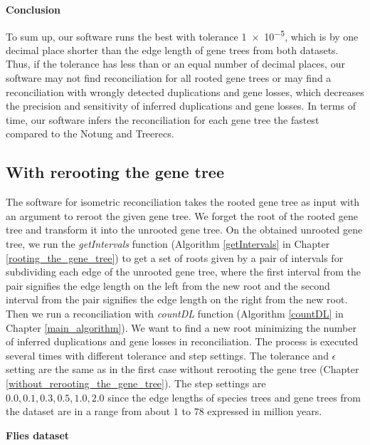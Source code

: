 \noindent \textbf{Conclusion}

To sum up, our software runs the best with tolerance \num {1e-5}, which is by one decimal place shorter than the edge length of gene trees from both datasets. Thus, if the tolerance has less than or an equal number of decimal places, our software may not find reconciliation for all rooted gene trees or may find a reconciliation with wrongly detected duplications and gene losses, which decreases the precision and sensitivity of inferred duplications and gene losses. In terms of time, our software infers the reconciliation for each gene tree the fastest compared to the Notung and Treerecs.


\subsection{With rerooting the gene tree}

The software for isometric reconciliation takes the rooted gene tree as input with an argument to reroot the given gene tree. We forget the root of the rooted gene tree and transform it into the unrooted gene tree. On the obtained unrooted gene tree, we run the \emph{getIntervals} function (Algorithm \ref{getIntervals} in Chapter \ref{rooting_the_gene_tree}) to get a set of roots given by a pair of intervals for subdividing each edge of the unrooted gene tree, where the first interval from the pair signifies the edge length on the left from the new root and the second interval from the pair signifies the edge length on the right from the new root. Then we run a reconciliation with \emph{countDL} function (Algorithm \ref{countDL} in Chapter \ref{main_algorithm}). We want to find a new root minimizing the number of inferred duplications and gene losses in reconciliation. The process is executed several times with different tolerance and step settings. The tolerance and $\epsilon$ setting are the same as in the first case without rerooting the gene tree (Chapter \ref{without_rerooting_the_gene_tree}). The step settings are $0.0, 0.1, 0.3, 0.5, 1.0, 2.0$ since the edge lengths of species trees and gene trees from the dataset are in a range from about $1$ to $78$ expressed in million years.

\noindent \textbf{Flies dataset}

